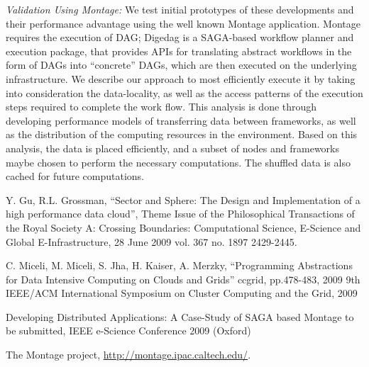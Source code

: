 \documentclass[a4paper,11pt]{article}
\begin{document}
{\it Validation Using Montage: } We test initial prototypes of these developments and their performance advantage using the well known Montage application.  Montage requires the execution of DAG;
Digedag is a SAGA-based workflow planner and execution package, that provides APIs for translating abstract workflows in the form of DAGs into “concrete” DAGs, which are then executed on the underlying infrastructure.
We describe our approach to most efficiently execute it by taking into consideration the data-locality, as well as the access patterns of the execution steps required to complete the work flow. This analysis is done through developing performance models of transferring data between frameworks, as well as the distribution of the computing resources in the environment. Based on this analysis, the data is placed efficiently, and a subset of nodes and frameworks maybe chosen to perform the necessary computations. The shuffled data is also cached for future computations.

\begin{thebibliography}{99}
\newblock Y. Gu, R.L. Grossman, “Sector and Sphere: The Design and Implementation of a high performance data cloud”, Theme Issue of the Philosophical Transactions of the Royal Society A: Crossing Boundaries: Computational Science, E-Science and Global E-Infrastructure, 28 June 2009 vol. 367 no. 1897 2429-2445.

\newblock C. Miceli, M. Miceli, S. Jha, H. Kaiser, A. Merzky, “Programming Abstractions for Data Intensive Computing on Clouds and Grids” ccgrid, pp.478-483, 2009 9th IEEE/ACM International Symposium on Cluster Computing and the Grid, 2009

\newblock Developing Distributed Applications: A Case-Study of SAGA based Montage
to be submitted, IEEE e-Science Conference 2009 (Oxford)

 The Montage project, \url{http://montage.ipac.caltech.edu/}.

\end{thebibliography}
\end{document}
